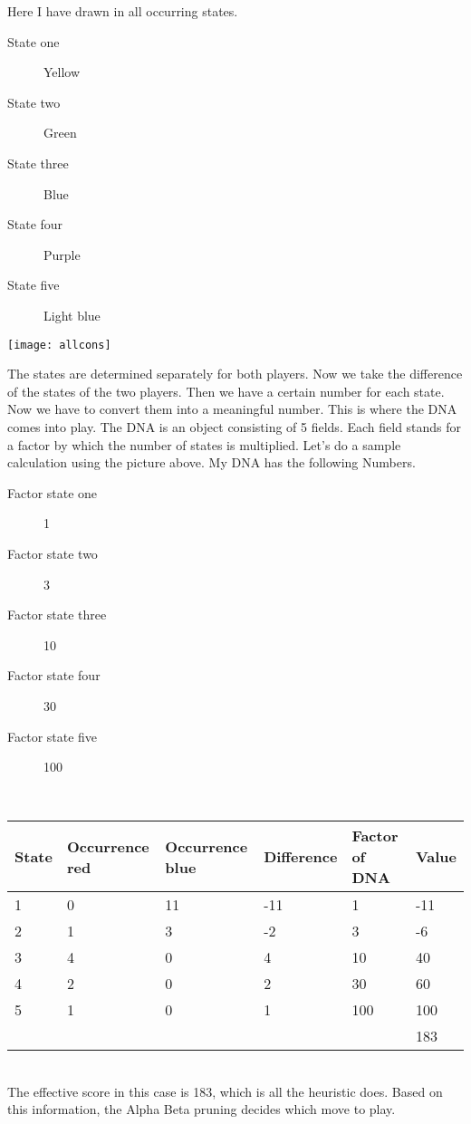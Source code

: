 Here I have drawn in all occurring states.
\begin{description}
\item[State one] Yellow
\item[State two] Green
\item[State three] Blue
\item[State four] Purple
\item[State five] Light blue
\end{description}
\begin{fixedpic}
	\centering
	\texttt{[image: allcons]}
\end{fixedpic}
The states are determined separately for both players. Now we take the difference of the states of the two players. Then we have a certain number for each state. Now we have to convert them into a meaningful number. This is where the DNA comes into play. The DNA is an object consisting of 5 fields. Each field stands for a factor by which the number of states is multiplied.
Let's do a sample calculation using the picture above. My DNA has the following Numbers.
\begin{description}
\item[Factor state one] 1
\item[Factor state two] 3
\item[Factor state three] 10
\item[Factor state four] 30
\item[Factor state five] 100
\end{description}\\
\begin{tabularx}{\textwidth}{|X|X|X|X|X|X|}
\hline
State & Occurrence red & Occurrence blue & Difference & Factor of DNA & Value \\\hline
1	& 0	& 11	& -11	& 1 	& -11 \\\hline
2	& 1	& 3 	& -2	& 3 	& -6 \\\hline
3	& 4	& 0 	& 4 	& 10	& 40 \\\hline
4	& 2	& 0 	& 2 	& 30	& 60 \\\hline
5	& 1	& 0 	& 1 	& 100	& 100 \\\hline
\multicolumn{5}{X|}{} & 183 \\\cline{6-6}
\end{tabularx}\\
The effective score in this case is 183, which is all the heuristic does. Based on this information, the Alpha Beta pruning decides which move to play.







